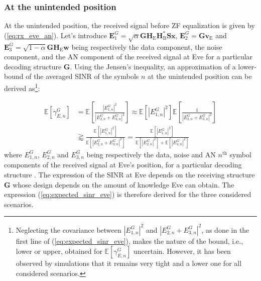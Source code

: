 \documentclass[journal,comsoc]{IEEEtran}
\newcommand{\EX}[1]{\mathbb{E} \left[#1\right]}%
\newcommand{\HE}{\textbf{H}_{\text{E}}}
\newcommand{\HB}{\textbf{H}_{\text{B}}}
\newcommand{\spread}{\textbf{S}}
\newcommand{\w}{\textbf{w}}
\newcommand{\mat}[1]{\boldsymbol{\mathrm{#1}}}
\begin{document}
\subsubsection{At the unintended position}
At the unintended position, the received signal before ZF equalization is given by (\ref{eq:rx_eve_an}). Let's introduce $\textbf{E}_1^G = \sqrt{\alpha}  \textbf{G} \HE \HB^* \spread\textbf{x} $, $\textbf{E}_2^G = \textbf{G}  \textbf{v}_\text{E}$ and $\textbf{E}_3^G = \sqrt{1-\alpha} \textbf{G} \HE \w$ being respectively the data component, the noise component, and the AN component of the received signal at Eve  for a particular decoding structure $\textbf{G}$. Using the Jensen's inequality, an approximation of a lower-bound of the averaged SINR of the symbols $n$ at the unintended position can be derived as\footnote{Neglecting the covariance between $\left|E_{1,n}^G\right|^2$ and $\left| E_{2,n}^G + E_{3,n}^G \right|^2$, as  done in the first line of (\ref{eq:expected_sinr_eve}), makes the nature of the bound, i.e., lower or upper, obtained for $\EX{\gamma_{E,n}^G}$ uncertain. However, it has been observed by simulations that it remains very tight and a lower one for all considered scenarios.}:

\begin{equation}
\begin{split}
\EX{\gamma_{E,n}^G} &= \EX{  \frac{ \left| E_{1,n}^G \right|^2  }{ \left| E_{2,n}^G + E_{3,n}^G \right|^2 } }  \approx  \EX{ \left| E_{1,n}^G \right|^2 }  \EX{ \frac{1}{ \left| E_{2,n}^G + E_{3,n}^G \right|^2} }  \\
& \gtrapprox \frac{\EX{   \left| E_{1,n}^G \right|^2  } }{\EX{ \left| E_{2,n}^G + E_{3,n}^G \right|^2  }} =  \frac{\EX{  \left| E_{1,n}^G \right|^2  } }{\EX{  \left| E_{2,n}^G \right|^2  } +  \EX{  \left|E_{3,n}^G \right|^2  }}
\label{eq:expected_sinr_eve}
\end{split}
\end{equation}
where $E_{1,n}^G$, $E_{2,n}^G$ and $E_{3,n}^G$ being respectively the data, noise and AN $n^{\text{th}}$ symbol components of the received signal at Eve's position, for a particular decoding structure \mat{G}. The expression of the SINR at Eve depends on the receiving structure $\textbf{G}$ whose design depends on the amount of knowledge Eve can obtain. The expression (\ref{eq:expected_sinr_eve}) is therefore derived for  the three considered scenarios.
\end{document}
